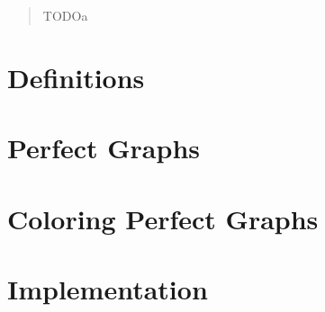 \documentclass{report}
\author{Adrian Siwiec}
\date{\today{}}
\begin{document}

\pagebreak

\begin{abstract}
	TODOa
\end{abstract}

\listoftheorems[ignoreall,show={defn}]
\renewcommand{\listtheoremname}{List of algorithms}
\listoftheorems[ignoreall,show={alg}]
\tableofcontents

\pagebreak

\chapter*{Definitions}


\chapter{Perfect Graphs}


\chapter{Coloring Perfect Graphs}


\chapter{Implementation}



\appendix
\appendixpage
\addappheadtotoc



% 
\printbibliography

% 	
\end{document}
